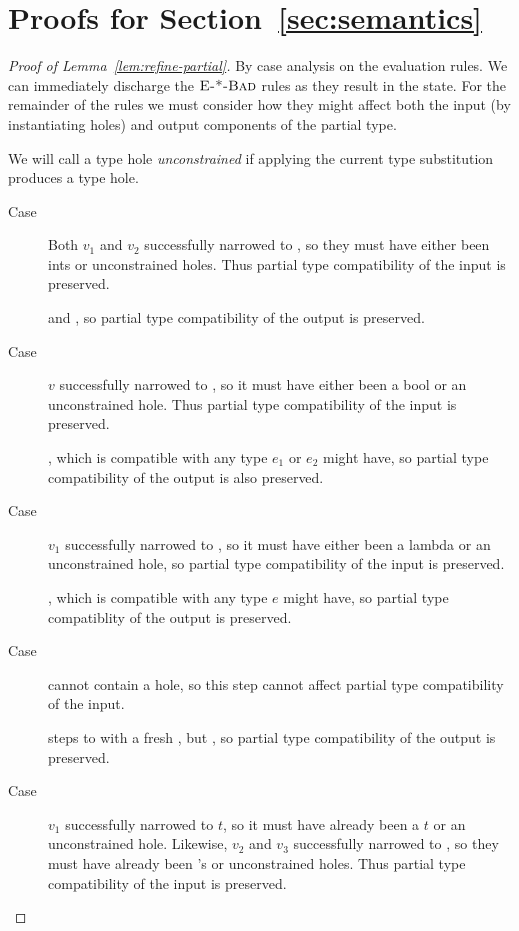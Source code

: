 \section{Proofs for Section~\ref{sec:semantics}}
\label{sec:proofs}

\begin{proof}[Proof of Lemma~\ref{lem:refine-partial}]
  By case analysis on the evaluation rules. We can immediately discharge
  the $\textsc{E-*-Bad}$ rules as they result in the \stuck state. For
  the remainder of the rules we must consider how they might affect both
  the input (by instantiating holes) and output components of the
  partial type.

  We will call a type hole \thole \emph{unconstrained} if applying the
  current type substitution \subst{\tsu}{\thole} produces a type hole.

  \begin{description}
  \item[Case \replusgood] Both $v_1$ and $v_2$ successfully narrowed to
    \tint, so they must have either been ints or unconstrained
    holes. Thus partial type compatibility of the input is preserved.

     and
    , so partial type compatibility of the output is
    preserved.
  \item[Case ] $v$ successfully narrowed to
    \tbool, so it must have either been a bool or an unconstrained hole.
    Thus partial type compatibility of the input is preserved.

    , which is compatible with any
    type $e_1$ or $e_2$ might have, so partial type compatibility of the
    output is also preserved.
  \item[Case \reappgood] $v_1$ successfully narrowed to \tfun, so it
    must have either been a lambda or an unconstrained hole, so partial
    type compatibility of the input is preserved.

    , which is compatible with any type
    $e$ might have, so partial type compatiblity of the output is
    preserved.
  \item[Case \releafgood] \eleaf cannot contain a hole, so this step cannot
    affect partial type compatibility of the input.

    \eleaf steps to \vleaf{\thole} with a fresh \thole,
    but \hastype{\eleaf}{\ttree{\thole}}, so partial type compatibility
    of the output is preserved.
  \item[Case \renodegood] $v_1$ successfully narrowed to $t$, so it must
    have already been a $t$ or an unconstrained hole. Likewise, $v_2$
    and $v_3$ successfully narrowed to , so they must have
    already been 's or unconstrained holes. Thus partial type
    compatibility of the input is preserved. 


\end{description}
\end{proof}
